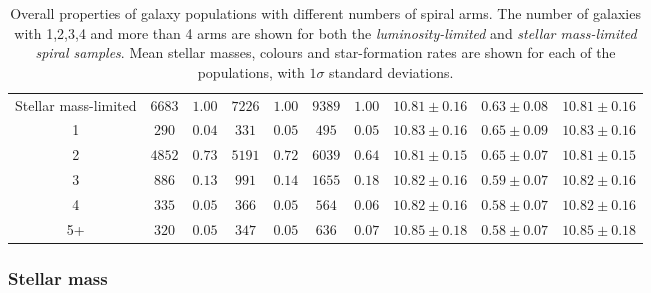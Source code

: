 \documentclass[useAMS,usenatbib]{mn2e}
\begin{document}
\begin{table}
\begin{tabular}{cccccccccc}
 Stellar mass-limited & $6683$    & $1.00$    & $7226$    & $1.00$    & $9389$         & $1.00$         & $10.81\pm 0.16$                    & $0.63\pm 0.08$ & $10.81\pm 0.16$              \\
 1                    & $290$     & $0.04$    & $331$     & $0.05$    & $495$          & $0.05$         & $10.83\pm 0.16$                    & $0.65\pm 0.09$ & $10.83\pm 0.16$              \\
 2                    & $4852$    & $0.73$    & $5191$    & $0.72$    & $6039$         & $0.64$         & $10.81\pm 0.15$                    & $0.65\pm 0.07$ & $10.81\pm 0.15$              \\
 3                    & $886$     & $0.13$    & $991$     & $0.14$    & $1655$         & $0.18$         & $10.82\pm 0.16$                    & $0.59\pm 0.07$ & $10.82\pm 0.16$              \\
 4                    & $335$     & $0.05$    & $366$     & $0.05$    & $564$          & $0.06$         & $10.82\pm 0.16$                    & $0.58\pm 0.07$ & $10.82\pm 0.16$              \\
 5+                   & $320$     & $0.05$    & $347$     & $0.05$    & $636$          & $0.07$         & $10.85\pm 0.18$                    & $0.58\pm 0.07$ & $10.85\pm 0.18$              \\
\hline
\end{tabular}



\caption{Overall properties of galaxy populations with different numbers of spiral arms. The number of galaxies with 1,2,3,4 and more than 4 arms are shown for both the \textit{luminosity-limited} and \textit{stellar mass-limited spiral samples}. Mean stellar masses, colours and star-formation rates are shown for each of the populations, with $1\sigma$ standard deviations.}

\label{table:overall_property_table}

\end{table}

\subsubsection{Stellar mass}
\label{sec:mass}
\end{document}
